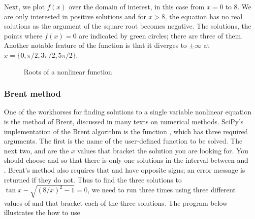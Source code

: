 \documentclass[letterpaper,10pt,english]{sphinxmanual}
\begin{document}
Next, we plot \(f(x)\) over the domain of interest, in this case from \(x=0\) to 8.  We are only interested in positive solutions and for \(x>8\), the equation has no real solutions as the argument of the square root becomes negative.  The solutions, the points where \(f(x)=0\) are indicated by green circles; there are three of them. Another notable feature of the function is that it diverges to \(\pm\infty\) at \(x = \{0, \pi/2, 3\pi/2, 5\pi/2\}\).
\begin{figure}[htbp]
\centering
\capstart

\caption{Roots of a nonlinear function}\label{chap9/chap9_scipy:fig-rootdemo}\end{figure}


\subsubsection{Brent method}
\label{chap9/chap9_scipy:brent-method}\label{chap9/chap9_scipy:index-12}
One of the workhorses for finding solutions to a single variable nonlinear equation is the method of Brent, discussed in many texts on numerical methods.  SciPy's implementation of the Brent algorithm is the function , which has three required arguments.  The first  is the name of the user-defined function to be solved.  The next two,  and  are the \(x\) values that bracket the solution you are looking for.  You should choose  and  so that there is only one solutions in the interval between  and .  Brent's method also requires that  and  have opposite signs; an error message is returned if they do not.  Thus to find the three solutions to \(\tan x - \sqrt{(8/x)^2-1} = 0\), we need to run  three times using three different values of  and  that bracket each of the three solutions.  The program below illustrates the how to use 
\end{document}
